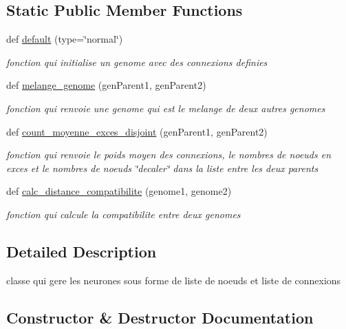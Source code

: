 \subsection*{Static Public Member Functions}
\begin{DoxyCompactItemize}
\item 
def \hyperlink{classsrc_1_1_i_a_1_1genome_1_1_genome_abaffc777e83e14be746e97f0b7b30738}{default} (type=\char`\"{}normal\char`\"{})
\begin{DoxyCompactList}\small\item\em fonction qui initialise un genome avec des connexions definies \end{DoxyCompactList}\item 
def \hyperlink{classsrc_1_1_i_a_1_1genome_1_1_genome_aa0ad761608127d6f8cdb4287149643fd}{melange\+\_\+genome} (gen\+Parent1, gen\+Parent2)
\begin{DoxyCompactList}\small\item\em fonction qui renvoie une genome qui est le melange de deux autres genomes \end{DoxyCompactList}\item 
def \hyperlink{classsrc_1_1_i_a_1_1genome_1_1_genome_ac41d60cc40e0bbc452046d888196ac8d}{count\+\_\+moyenne\+\_\+exces\+\_\+disjoint} (gen\+Parent1, gen\+Parent2)
\begin{DoxyCompactList}\small\item\em fonction qui renvoie le poids moyen des connexions, le nombres de noeuds en exces et le nombres de noeuds \char`\"{}decaler\char`\"{} dans la liste entre les deux parents \end{DoxyCompactList}\item 
def \hyperlink{classsrc_1_1_i_a_1_1genome_1_1_genome_a03d70c35344336c68ea06ebcea2dd941}{calc\+\_\+distance\+\_\+compatibilite} (genome1, genome2)
\begin{DoxyCompactList}\small\item\em fonction qui calcule la compatibilite entre deux genomes \end{DoxyCompactList}\end{DoxyCompactItemize}


\subsection{Detailed Description}
classe qui gere les neurones sous forme de liste de noeuds et liste de connexions 

\subsection{Constructor \& Destructor Documentation}
\mbox{\label{classsrc_1_1_i_a_1_1genome_1_1_genome_aa2ac658a0a10371801446a2631bd4cab}} 
